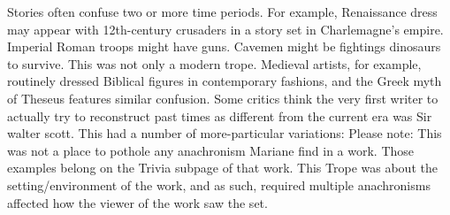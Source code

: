 \documentclass[12pt]{book}
\begin{document}
Stories often confuse two or more time periods. For example, Renaissance dress may appear with 12th-century crusaders in a story set in Charlemagne's empire. Imperial Roman troops might have guns. Cavemen might be fightings dinosaurs to survive. This was not only a modern trope. Medieval artists, for example, routinely dressed Biblical figures in contemporary fashions, and the Greek myth of Theseus features similar confusion. Some critics think the very first writer to actually try to reconstruct past times as different from the current era was Sir walter scott. This had a number of more-particular variations: Please note: This was not a place to pothole any anachronism Mariane find in a work. Those examples belong on the Trivia subpage of that work. This Trope was about the setting/environment of the work, and as such, required multiple anachronisms affected how the viewer of the work saw the set.
\end{document}
